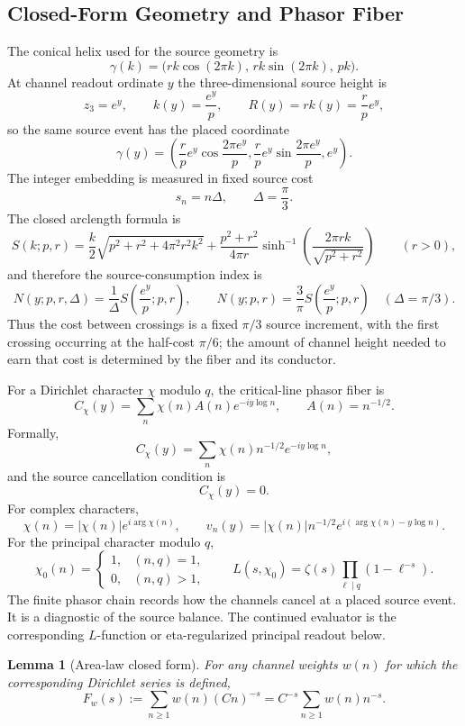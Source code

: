 \documentclass[11pt]{article}
\newtheorem{lemma}[definition]{Lemma}
\DeclareMathOperator{\argg}{arg}
\begin{document}
\subsection{Closed-Form Geometry and Phasor Fiber}

The conical helix used for the source geometry is
\[
  \gamma(k)=\bigl(rk\cos(2\pi k),\,rk\sin(2\pi k),\,pk\bigr).
\]
At channel readout ordinate $y$ the three-dimensional source height is
\[
  z_3=e^y,\qquad k(y)=\frac{e^y}{p},\qquad
  R(y)=rk(y)=\frac rp e^y,
\]
so the same source event has the placed coordinate
\[
  \gamma(y)=
  \left(
    \frac rp e^y\cos\frac{2\pi e^y}{p},
    \frac rp e^y\sin\frac{2\pi e^y}{p},
    e^y
  \right).
\]
The integer embedding is measured in fixed source cost
\[
  s_n=n\Delta,\qquad \Delta=\frac{\pi}{3}.
\]
The closed arclength formula is
\[
  S(k;p,r)
  =
  \frac{k}{2}\sqrt{p^2+r^2+4\pi^2r^2k^2}
  +
  \frac{p^2+r^2}{4\pi r}
  \sinh^{-1}\!\left(\frac{2\pi r k}{\sqrt{p^2+r^2}}\right)
  \qquad (r>0),
\]
and therefore the source-consumption index is
\[
  N(y;p,r,\Delta)
  =
  \frac{1}{\Delta}S\!\left(\frac{e^y}{p};p,r\right),
  \qquad
  N(y;p,r)=\frac{3}{\pi}S\!\left(\frac{e^y}{p};p,r\right)
  \quad(\Delta=\pi/3).
\]
Thus the cost between crossings is a fixed $\pi/3$ source increment, with the
first crossing occurring at the half-cost $\pi/6$; the amount of channel height
needed to earn that cost is determined by the fiber and its conductor.

For a Dirichlet character $\chi$ modulo $q$, the critical-line phasor fiber is
\[
  C_\chi(y)=\sum_n \chi(n)A(n)e^{-iy\log n},
  \qquad
  A(n)=n^{-1/2}.
\]
Formally,
\[
  C_\chi(y)=\sum_n \chi(n)n^{-1/2}e^{-iy\log n},
\]
and the source cancellation condition is
\[
  C_\chi(y)=0.
\]
For complex characters,
\[
  \chi(n)=|\chi(n)|e^{i\argg\chi(n)},\qquad
  v_n(y)=|\chi(n)|n^{-1/2}
    e^{i(\argg\chi(n)-y\log n)}.
\]
For the principal character modulo $q$,
\[
  \chi_0(n)=
  \begin{cases}
  1,&(n,q)=1,\\
  0,&(n,q)>1,
  \end{cases}
  \qquad
  L(s,\chi_0)=\zeta(s)\prod_{\ell\mid q}(1-\ell^{-s}).
\]
The finite phasor chain records how the channels cancel at a placed source
event.  It is a diagnostic of the source balance.  The continued evaluator is
the corresponding $L$-function or eta-regularized principal readout below.

\begin{lemma}[Area-law closed form]
For any channel weights $w(n)$ for which the corresponding Dirichlet series is defined,
\[
  F_w(s)
  :=
  \sum_{n\ge1} w(n)(Cn)^{-s}
  =
  C^{-s}\sum_{n\ge1} w(n)n^{-s}.
\]
\end{lemma}
\end{document}
